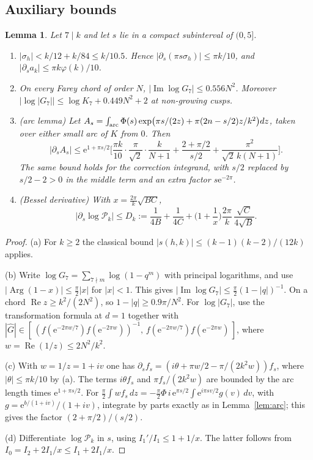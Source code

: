 \documentclass[11pt]{amsart}
\newtheorem{lemma}[theorem]{Lemma}
\theoremstyle{remark}
\theoremstyle{definition}
\newcommand{\cP}{\mathcal P}
\newcommand{\Rea}{\operatorname{Re}}
\newcommand{\Ima}{\operatorname{Im}}
\newcommand{\Arg}{\operatorname{Arg}}
\newcommand{\e}{\mathrm e}
\begin{document}
\subsection{Auxiliary bounds}
\begin{lemma}\label{lem:aux}
Let $7\mid k$ and let $s$ lie in a compact subinterval of $(0,5]$.
\begin{enumerate}[label=(\alph*),leftmargin=2em]
\item $|\sigma_h|<k/12+k/84\le k/10.5$. Hence $|\partial_s(\pi s\sigma_h)|\le\pi k/10$, and $|\partial_s a_k|\le\pi k\varphi(k)/10$.
\item On every Farey chord of order $N$, $|\Ima\log G_7|\le0.556N^2$. Moreover $|\log|G_7||\le\log K_7+0.449N^2+2$ at non-growing cusps.
\item \emph{(arc lemma)} Let $A_s=\int_{\rm arc}\Phi(s)\exp\!\big(\pi s/(2z)+\pi(2n-s/2)z/k^2\big)dz$, taken over either small arc of $K$ from $0$. Then
\[
|\partial_sA_s|\le\e^{1+\pi s/2}\Big[\frac{\pi k}{10}\cdot\frac{\pi}{\sqrt2}\cdot\frac{k}{N+1}+\frac{2+\pi/2}{s/2}+\frac{\pi^2}{\sqrt2\,k(N+1)}\Big].
\]
The same bound holds for the correction integrand, with $s/2$ replaced by $s/2-2>0$ in the middle term and an extra factor $s\e^{-2\pi}$.
\item \emph{(Bessel derivative)} With $x=\frac{2\pi}k\sqrt{BC}$,
\[
|\partial_s\log\cP_k|\le D_k:=\frac1{4B}+\frac1{4C}+\Big(1+\frac1x\Big)\frac{2\pi}k\,\frac{\sqrt C}{4\sqrt B}.
\]
\end{enumerate}
\end{lemma}
\begin{proof}
(a) For $k\ge2$ the classical bound $|s(h,k)|\le(k-1)(k-2)/(12k)$ applies.

(b) Write $\log G_7=\sum_{7\nmid m}\log(1-q^m)$ with principal logarithms, and use $|\Arg(1-x)|\le\frac\pi2|x|$ for $|x|<1$. This gives $|\Ima\log G_7|\le\frac\pi2(1-|q|)^{-1}$. On a chord $\Rea z\ge k^2/(2N^2)$, so $1-|q|\ge0.9\pi/N^2$. For $\log|G_7|$, use the transformation formula at $d=1$ together with $|\widehat G|\in[\,(f(\e^{-2\pi w/7})f(\e^{-2\pi w}))^{-1},\,f(\e^{-2\pi w/7})f(\e^{-2\pi w})\,]$, where $w=\Rea(1/z)\le2N^2/k^2$.

(c) With $w=1/z=1+iv$ one has $\partial_sf_s=(i\theta+\pi w/2-\pi/(2k^2w))f_s$, where $|\theta|\le\pi k/10$ by (a). The terms $i\theta f_s$ and $\pi f_s/(2k^2w)$ are bounded by the arc length times $\e^{1+\pi s/2}$. For $\frac\pi2\int wf_s\,dz=-\frac{\pi}2\Phi\,i\,\e^{\pi s/2}\int\e^{i\pi sv/2}g(v)\,dv$, with $g=\e^{b/(1+iv)}/(1+iv)$, integrate by parts exactly as in Lemma~\ref{lem:arc}; this gives the factor $(2+\pi/2)/(s/2)$.

(d) Differentiate $\log\cP_k$ in $s$, using $I_1'/I_1\le1+1/x$. The latter follows from $I_0=I_2+2I_1/x\le I_1+2I_1/x$.
\end{proof}
\end{document}
